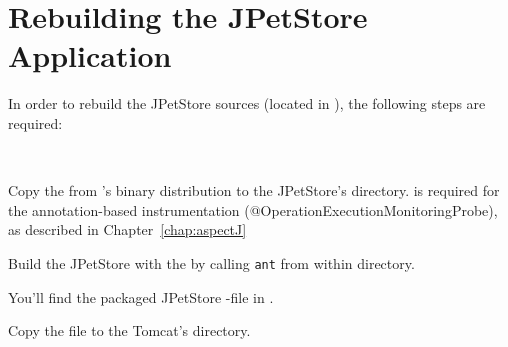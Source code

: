 \begin{figure}\centering
\hfill
{}
\hfill
{}
\hfill
\caption{}
\end{figure}

\newpage

\section{Rebuilding the JPetStore Application}\label{sec:Appendix:JPetStoreExample:rebuild}

\noindent In order to rebuild the JPetStore sources (located in ), 
the following steps are required:

\

\begin{compactenum}
\item Copy the \mainJar{} from \Kieker{}'s
   binary distribution to the JPetStore's  directory. %
   \mainJar{} is required for the annotation-based instrumentation %
   (@OperationExecutionMonitoringProbe), as described in Chapter~\ref{chap:aspectJ}
\item Build the JPetStore with the  by calling \texttt{ant} from %
    within  directory. 
\item You'll find the packaged JPetStore -file in .
\item Copy the file to the Tomcat's  directory.
\end{compactenum}

